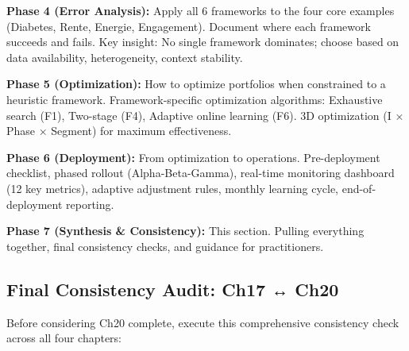 \begin{definition}
\textbf{Phase 4 (Error Analysis):} Apply all 6 frameworks to the four core examples (Diabetes, Rente, Energie, Engagement). Document where each framework succeeds and fails. Key insight: No single framework dominates; choose based on data availability, heterogeneity, context stability.

\textbf{Phase 5 (Optimization):} How to optimize portfolios when constrained to a heuristic framework. Framework-specific optimization algorithms: Exhaustive search (F1), Two-stage (F4), Adaptive online learning (F6). 3D optimization (I × Phase × Segment) for maximum effectiveness.

\textbf{Phase 6 (Deployment):} From optimization to operations. Pre-deployment checklist, phased rollout (Alpha-Beta-Gamma), real-time monitoring dashboard (12 key metrics), adaptive adjustment rules, monthly learning cycle, end-of-deployment reporting.

\textbf{Phase 7 (Synthesis \& Consistency):} This section. Pulling everything together, final consistency checks, and guidance for practitioners.

\end{definition}

\subsection{Final Consistency Audit: Ch17 ↔ Ch20}

Before considering Ch20 complete, execute this comprehensive consistency check across all four chapters:

